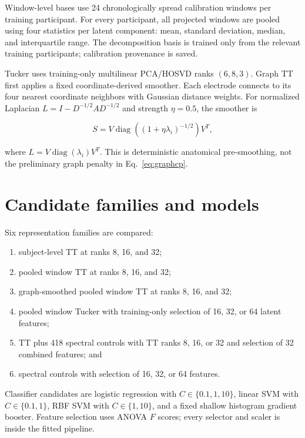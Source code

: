 Window-level bases use 24 chronologically spread calibration windows per
training participant. For every participant, all projected windows are pooled
using four statistics per latent component: mean, standard deviation, median,
and interquartile range. The decomposition basis is trained only from the
relevant training participants; calibration provenance is saved.

Tucker uses training-only multilinear PCA/HOSVD ranks $(6,8,3)$. Graph TT first
applies a fixed coordinate-derived smoother. Each electrode connects to its four
nearest coordinate neighbors with Gaussian distance weights. For normalized
Laplacian $L=I-D^{-1/2}AD^{-1/2}$ and strength $\eta=0.5$, the smoother is

\begin{equation}
S=V\operatorname{diag}\left((1+\eta\lambda_i)^{-1/2}\right)V^T,
\end{equation}

where $L=V\operatorname{diag}(\lambda_i)V^T$. This is deterministic anatomical
pre-smoothing, not the preliminary graph penalty in Eq.~\ref{eq:graphcp}.

\section{Candidate families and models}

Six representation families are compared:

\begin{enumerate}
  \item subject-level TT at ranks 8, 16, and 32;
  \item pooled window TT at ranks 8, 16, and 32;
  \item graph-smoothed pooled window TT at ranks 8, 16, and 32;
  \item pooled window Tucker with training-only selection of 16, 32, or 64
  latent features;
  \item TT plus 418 spectral controls with TT ranks 8, 16, or 32 and selection
  of 32 combined features; and
  \item spectral controls with selection of 16, 32, or 64 features.
\end{enumerate}

Classifier candidates are logistic regression with $C\in\{0.1,1,10\}$, linear
SVM with $C\in\{0.1,1\}$, RBF SVM with $C\in\{1,10\}$, and a fixed shallow
histogram gradient booster. Feature selection uses ANOVA $F$ scores; every
selector and scaler is inside the fitted pipeline.

